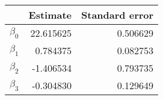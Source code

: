 \begin{tabular}{lrr}
\toprule
{} &   Estimate &  Standard error \\
\midrule
$\beta_0$ &  22.615625 &        0.506629 \\
$\beta_1$ &   0.784375 &        0.082753 \\
$\beta_2$ &  -1.406534 &        0.793735 \\
$\beta_3$ &  -0.304830 &        0.129649 \\
\bottomrule
\end{tabular}
